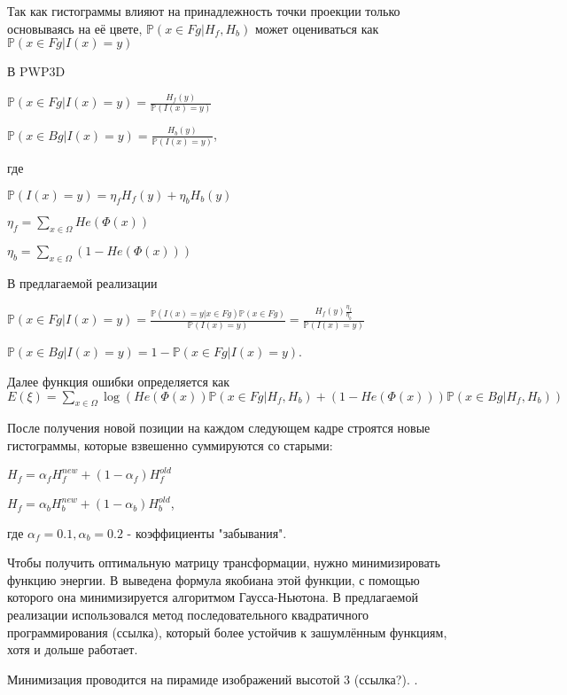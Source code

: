 Так как гистограммы влияют на принадлежность точки проекции только основываясь
на её цвете,
$\mathbb{P}(x \in Fg | H_f, H_b)$
может оцениваться как
$\mathbb{P}(x \in Fg | I(x) = y)$

В PWP3D

$
    \mathbb{P}(x \in Fg | I(x) = y) = \frac{H_f(y)}{\mathbb{P}(I(x) = y)}
$

$
    \mathbb{P}(x \in Bg | I(x) = y) = \frac{H_b(y)}{\mathbb{P}(I(x) = y)}
$,

где

$
    \mathbb{P}(I(x) = y) = \eta_f H_f(y) + \eta_b H_b(y)
$

$
    \eta_f = \sum\limits_{x \in \Omega}He(\Phi(x))
$

$
    \eta_b = \sum\limits_{x \in \Omega}(1 - He(\Phi(x)))
$

В предлагаемой реализации

$
    \mathbb{P}(x \in Fg | I(x) = y) = \frac{\mathbb{P}(I(x) = y | x \in Fg) \mathbb{P}(x \in Fg)}{\mathbb{P}(I(x) = y)} = \frac{H_f(y)\frac{\eta_f}{\eta_b}}{\mathbb{P}(I(x) = y)}
$

$
    \mathbb{P}(x \in Bg | I(x) = y) = 1 - \mathbb{P}(x \in Fg | I(x) = y)
$.

Далее функция ошибки определяется как
$
    E(\xi) = \sum\limits_{x \in \Omega}\log(He(\Phi(x))\mathbb{P}(x \in Fg | H_f, H_b) + (1 - He(\Phi(x)))\mathbb{P}(x \in Bg|H_f, H_b))
$

После получения новой позиции на каждом следующем кадре строятся новые
гистограммы, которые взвешенно суммируются со старыми: 

$
    H_{f} = \alpha_f H_{f}^{new} + (1 - \alpha_f) H_f^{old}
$

$
    H_{f} = \alpha_b H_{b}^{new} + (1 - \alpha_b) H_b^{old}
$, 

где $\alpha_f = 0.1, \alpha_b = 0.2$ - коэффициенты "забывания".

Чтобы получить оптимальную матрицу трансформации, нужно минимизировать функцию
энергии.
В \cite{Tjaden2018} выведена формула якобиана этой функции, с помощью которого
она минимизируется алгоритмом Гаусса-Ньютона.
В предлагаемой реализации использовался метод последовательного квадратичного
программирования (ссылка), который более устойчив к зашумлённым функциям, хотя
и дольше работает. 

Минимизация проводится на пирамиде изображений высотой 3 (ссылка?).
.

